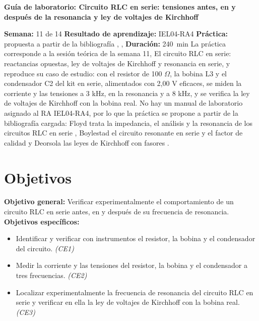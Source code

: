 \documentclass[12pt]{article}
\begin{document}
\nocite{ref1,ref2,ref3}

\datosguia
\lineablanco

{\centering\bfseries Guía de laboratorio: Circuito RLC en serie: tensiones antes, en y después de la resonancia y ley de voltajes de Kirchhoff\par}
\lineablanco
\textbf{Semana:} 11 de 14 \quad \textbf{Resultado de aprendizaje:} IEL04-RA4 \quad \textbf{Práctica:} propuesta a partir de la bibliografía \cite{ref1}, \cite{ref2}, \cite{ref3} \quad \textbf{Duración:} \SI{240}{\minute}
\lineablanco
La práctica corresponde a la sesión teórica de la semana 11, \guillemotleft{}El circuito RLC en serie: reactancias opuestas, ley de voltajes de Kirchhoff y resonancia en serie\guillemotright{}, y reproduce su caso de estudio: con el resistor de 100 \ensuremath{\Omega}, la bobina L3 y el condensador C2 del kit en serie, alimentados con 2,00 V eficaces, se miden la corriente y las tensiones a 3 kHz, en la resonancia y a 8 kHz, y se verifica la ley de voltajes de Kirchhoff con la bobina real. No hay un manual de laboratorio asignado al RA IEL04-RA4, por lo que la práctica se propone a partir de la bibliografía cargada: Floyd trata la impedancia, el análisis y la resonancia de los circuitos RLC en serie \cite{ref1}, Boylestad el circuito resonante en serie y el factor de calidad \cite{ref2} y Deorsola las leyes de Kirchhoff con fasores \cite{ref3}.

\section{Objetivos}\label{sec:objetivos}
\textbf{Objetivo general:} Verificar experimentalmente el comportamiento de un circuito RLC en serie antes, en y después de su frecuencia de resonancia.
\lineablanco
\textbf{Objetivos específicos:}
\begin{itemize}
  \item Identificar y verificar con instrumentos el resistor, la bobina y el condensador del circuito. \emph{(CE1)}
  \item Medir la corriente y las tensiones del resistor, la bobina y el condensador a tres frecuencias. \emph{(CE2)}
  \item Localizar experimentalmente la frecuencia de resonancia del circuito RLC en serie y verificar en ella la ley de voltajes de Kirchhoff con la bobina real. \emph{(CE3)}
\end{itemize}
\end{document}
